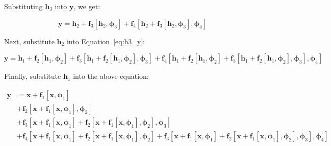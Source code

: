 \documentclass[12pt]{report}
\begin{document}
Substituting $\mathbf{h}_{3}$ into $\mathbf{y}$, we get:

\begin{equation}
    \mathbf{y} = \mathbf{h}_{2} + \mathbf{f}_{3}[\mathbf{h}_{2}, \boldsymbol{\phi}_{3}] + \mathbf{f}_{4}[\mathbf{h}_{2} + \mathbf{f}_{3}[\mathbf{h}_{2}, \boldsymbol{\phi}_{3}], \boldsymbol{\phi}_{4}]
    \label{eq:h3_y}
\end{equation}

Next, substitute $\mathbf{h}_{2}$ into Equation~\eqref{eq:h3_y}:

\begin{equation}
    \mathbf{y} = \mathbf{h}_{1} + \mathbf{f}_{2}[\mathbf{h}_{1}, \boldsymbol{\phi}_{2}] + \mathbf{f}_{3}[\mathbf{h}_{1} + \mathbf{f}_{2}[\mathbf{h}_{1}, \boldsymbol{\phi}_{2}], \boldsymbol{\phi}_{3}] + \mathbf{f}_{4}[\mathbf{h}_{1} + \mathbf{f}_{2}[\mathbf{h}_{1}, \boldsymbol{\phi}_{2}] + \mathbf{f}_{3}[\mathbf{h}_{1} + \mathbf{f}_{2}[\mathbf{h}_{1}, \boldsymbol{\phi}_{2}], \boldsymbol{\phi}_{3}], \boldsymbol{\phi}_{4}]
\end{equation}

Finally, substitute $\mathbf{h}_{1}$ into the above equation:

\begin{align*}
    \mathbf{y} & = \mathbf{x} + \mathbf{f}_{1}[\mathbf{x}, \boldsymbol{\phi}_{1}]                                                                                                                                                                                                                                                                                                                                                                        \\
               & + \mathbf{f}_{2}[\mathbf{x} + \mathbf{f}_{1}[\mathbf{x}, \boldsymbol{\phi}_{1}], \boldsymbol{\phi}_{2}]                                                                                                                                                                                                                                                                                                                                 \\
               & + \mathbf{f}_{3}[\mathbf{x} + \mathbf{f}_{1}[\mathbf{x}, \boldsymbol{\phi}_{1}] + \mathbf{f}_{2}[\mathbf{x} + \mathbf{f}_{1}[\mathbf{x}, \boldsymbol{\phi}_{1}], \boldsymbol{\phi}_{2}], \boldsymbol{\phi}_{3}]                                                                                                                                                                                                                         \\
               & + \mathbf{f}_{4}[\mathbf{x} + \mathbf{f}_{1}[\mathbf{x}, \boldsymbol{\phi}_{1}] + \mathbf{f}_{2}[\mathbf{x} + \mathbf{f}_{1}[\mathbf{x}, \boldsymbol{\phi}_{1}], \boldsymbol{\phi}_{2}] + \mathbf{f}_{3}[\mathbf{x} + \mathbf{f}_{1}[\mathbf{x}, \boldsymbol{\phi}_{1}] + \mathbf{f}_{2}[\mathbf{x} + \mathbf{f}_{1}[\mathbf{x}, \boldsymbol{\phi}_{1}], \boldsymbol{\phi}_{2}], \boldsymbol{\phi}_{3}], \boldsymbol{\phi}_{4}] \tag{3}
    \label{eq:11.3}
\end{align*}
\end{document}
